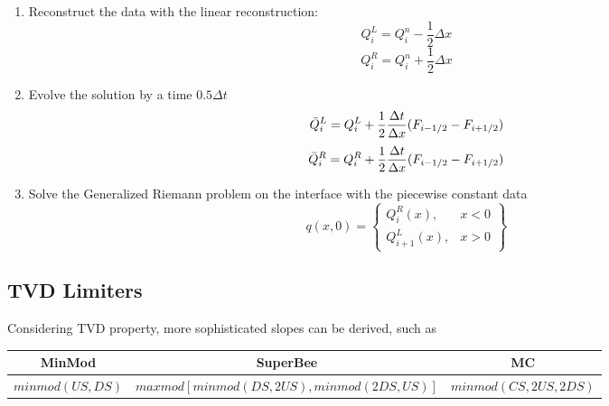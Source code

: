 \documentclass[journal,onecolumn]{IEEEtran}
\begin{document}
\begin{enumerate}
    \item Reconstruct the data with the linear reconstruction:
    \begin{equation}\label{muscl1}
         Q^L_i = Q_i^n - \frac{1}{2}\Delta x
    \end{equation}
    \begin{equation} \label{muscl2}
        Q^R_i = Q_i^n + \frac{1}{2}\Delta x
    \end{equation} 
    \item Evolve the solution by a time $0.5\Delta t$
    \begin{equation} \label{muscl3}
        \Bar{Q}^L_i = Q^L_i + \frac{1}{2}\frac{\Delta t}{\Delta x}(F_{i-1/2} - F_{i+1/2})
    \end{equation} \label{muscl4}
    \begin{equation}
         \Bar{Q}^R_i = Q^R_i + \frac{1}{2}\frac{\Delta t}{\Delta x}(F_{i-1/2} - F_{i+1/2})
    \end{equation}
       
    \item Solve the Generalized Riemann problem on the interface with the piecewise constant data
    \begin{equation} \label{muscl5}
    q(x,0) =  \left\{
        \begin{array}{ll}
            Q_i^R(x), & x < 0 \\
            Q_{i+1}^L(x), & x > 0
        \end{array} \right\}
    \end{equation} 
\end{enumerate}

\subsection{TVD Limiters}
Considering TVD property, more sophisticated slopes can be derived, such as
\begin{center}
\begin{tabular}{c|c|c}
     MinMod & SuperBee & MC \\
     \hline 
     $minmod (US, DS)$ & $maxmod [ minmod (DS, 2US), minmod (2DS, US) ]$ & $minmod (CS, 2US, 2DS)$
\end{tabular}
\end{center}
\newline
\end{document}
